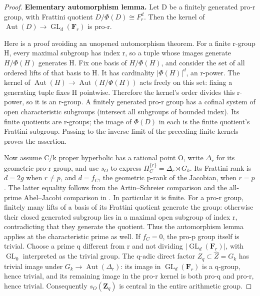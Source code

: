 \documentclass[11pt,a4paper]{article}
\begin{document}
\begin{proof}

\textbf{Elementary automorphism lemma.} Let D be a finitely generated pro-r group, with Frattini quotient \(D/\Phi(D)\cong F_r^d\). Then the kernel of \(\operatorname{Aut}(D){\to}\operatorname{GL}_d(\mathbf{F}_r)\) is pro-r.

Here is a proof avoiding an unopened automorphism theorem. For a finite r-group H, every maximal subgroup has index r, so a tuple whose images generate \(H/{\Phi}(H)\) generates H. Fix one basis of \(H/{\Phi}(H)\), and consider the set of all ordered lifts of that basis to H. It has cardinality \(|{\Phi}(H)|^d\), an r-power. The kernel of \(\operatorname{Aut}(H){\to}\operatorname{Aut}(H/{\Phi}(H))\) acts freely on this set: fixing a generating tuple fixes H pointwise. Therefore the kernel's order divides this r-power, so it is an r-group. A finitely generated pro-r group has a cofinal system of open characteristic subgroups (intersect all subgroups of bounded index). Its finite quotients are r-groups; the image of \({\Phi}(D)\) in each is the finite quotient's Frattini subgroup. Passing to the inverse limit of the preceding finite kernels proves the assertion.

Now assume C/k proper hyperbolic has a rational point O, write \({\Delta}_r\) for its geometric pro-r group, and use \(s_O\) to express \({\Pi}_C^{\{r\}}={\Delta}_r{\rtimes}G_k\). Its Frattini rank is \(d=2g\) when \(r\ne p\), and \(d=f_C\), the geometric p-rank of the Jacobian, when \(r=p\). The latter equality follows from the Artin--Schreier comparison and the all-prime Abel--Jacobi comparison in \cite[Proposition 9.1 and Lemma 9.4]{MilneJac}. In particular it is finite. For a pro-r group, finitely many lifts of a basis of its Frattini quotient generate the group: otherwise their closed generated subgroup lies in a maximal open subgroup of index r, contradicting that they generate the quotient. Thus the automorphism lemma applies at the characteristic prime as well. If \(f_C=0\), the pro-p group itself is trivial. Choose a prime q different from r and not dividing \(|\operatorname{GL}_d(\mathbf{F}_r)|\), with \(\operatorname{GL}_0\) interpreted as the trivial group. The q-adic direct factor \(Z_q\subset\widehat Z=G_k\) has trivial image under \(G_k{\to}\operatorname{Aut}({\Delta}_r)\): its image in \(\operatorname{GL}_d(\mathbf{F}_r)\) is a q-group, hence trivial, and its remaining image in the pro-r kernel is both pro-q and pro-r, hence trivial. Consequently \(s_O(\mathbf{Z}_q)\) is central in the entire arithmetic group.


\end{proof}
\end{document}
